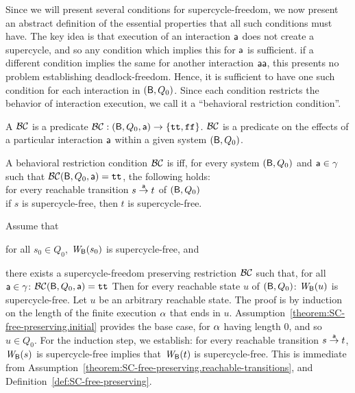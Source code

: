 Since we will present several conditions for supercycle-freedom, we now present an abstract
definition of the essential properties that all such conditions must have.  The key idea is that
execution of an interaction $\act$ does not create a supercycle, and so any condition which implies 
this for $\act$ is sufficient. if a different condition implies the same for another interaction
$\actp$, this presents no problem \wrt establishing deadlock-freedom. Hence, it is sufficient to
have one such condition for each interaction in  $(\B,Q_0)$. Since each condition restricts the
behavior of interaction execution, we call it a ``behavioral restriction condition''.



A  $\BC$ is a predicate
$\BC: (\B, Q_0, \act) \to \set{\ttt, \fff}$.
\ed
%
$\BC$ is a predicate on the effects of a particular interaction $\act$ within a given system
$(\B, Q_0)$.

 \label{def:SC-free-preserving}
A behavioral restriction condition $\BC$ is  iff, for every system 
$(\B, Q_0)$ and $\act \in \gamma$ such that $\BC(\B, Q_0, \act) = \ttt$, the following holds:\\[2ex]
%
\ind \ind for every reachable transition $s \goesto[\act] t$ of $(\B, Q_0)$\\
\ind \ind \ind if $s$ is supercycle-free, then $t$ is supercycle-free.
\ed


\label{theorem:SC-free-preserving.deadlock-free}
\label{thm:SC-free-preserving.deadlock-free}
Assume that
\bn
\item \label{theorem:SC-free-preserving.initial}
      for all $s_0 \in Q_0$, $\wfg{\B}{s_0}$ is supercycle-free, and
\item \label{theorem:SC-free-preserving.reachable-transitions}
   there exists a supercycle-freedom preserving restriction $\BC$ such that,
   for all $\act \in \gamma$: $\BC(\B, Q_0, \act) = \ttt$ 
\en
Then for every reachable state $u$ of $(\B, Q_0)$:  $\wfg{\B}{u}$ is supercycle-free.
\et
%
\bpr Let $u$ be an arbitrary reachable state. The proof is by induction on the length of the finite
execution $\al$ that ends in $u$.  Assumption~\ref{theorem:SC-free-preserving.initial} provides the
base case, for $\al$ having length 0, and so $u \in Q_0$.  For the induction step, we establish: for
every reachable transition $s \la{\act} t$, $\wfg{\B}{s}$ is supercycle-free implies that
$\wfg{\B}{t}$ is supercycle-free. This is immediate from
Assumption~\ref{theorem:SC-free-preserving.reachable-transitions}, and
Definition~\ref{def:SC-free-preserving}.  \epr

